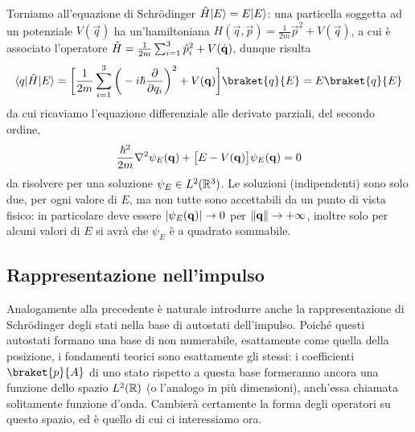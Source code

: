 Torniamo all'equazione di Schr\"odinger $\op H\ket{E}=E\ket{E}$: una particella soggetta ad un potenziale $V(\vec q)$ ha un'hamiltoniana $H(\vec q,\vec p)=\frac1{2m}\vec p^2+V(\vec q)$, a cui è associato l'operatore $\op H=\frac1{2m}\sum_{i=1}^3\op p_i^2+V(\op{\vec q})$, dunque risulta
\begin{equation}
	\bra{q}\op H\ket{E}=\bigg[\frac1{2m}\sum_{i=1}^3\bigg(-i\hbar\drp{}{q_i}\bigg)^2+V(\vec q)\bigg]\braket{q}{E}=E\braket{q}{E}
	\label{eq:hamiltoniano-coordinate}
\end{equation}
da cui ricaviamo l'equazione differenziale alle derivate parziali, del secondo ordine,
\begin{equation}
	\frac{\hbar^2}{2m}\lap\psi_E(\vec q)+\big[E-V(\vec q)\big]\psi_E(\vec q)=0
	\label{eq:schroedinger}
\end{equation}
da risolvere per una soluzione $\psi_E\in\leb[2]{\R^3}$.
Le soluzioni (indipendenti) sono solo due, per ogni valore di $E$, ma non tutte sono accettabili da un punto di vista fisico: in particolare deve essere $\abs{\psi_E(\vec q)}\to 0$ per $\norm{\vec q}\to+\infty$, inoltre solo per alcuni valori di $E$ si avrà che $\psi_E$ è a quadrato sommabile.

\subsection{Rappresentazione nell'impulso}
Analogamente alla precedente è naturale introdurre anche la rappresentazione di Schr\"odinger degli stati nella base di autostati dell'impulso.
Poich\'e questi autostati formano una base di non numerabile, esattamente come quella della posizione, i fondamenti teorici sono esattamente gli stessi: i coefficienti $\braket{p}{A}$ di uno stato rispetto a questa base formeranno ancora una funzione dello spazio $\leb[2]{\R}$ (o l'analogo in più dimensioni), anch'essa chiamata solitamente funzione d'onda.
Cambierà certamente la forma degli operatori su questo spazio, ed è quello di cui ci interessiamo ora.

